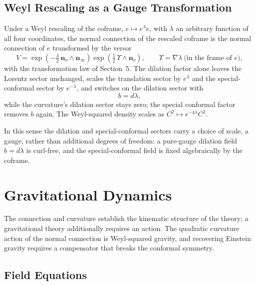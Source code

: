 \documentclass[11pt,a4paper]{article}
\newcommand{\nzero}{\mathbf{n}_o}
\newcommand{\ninf}{\mathbf{n}_\infty}
\newcommand{\wedgeprod}{\mathbin{\wedge}}
\begin{document}
\subsection{Weyl Rescaling as a Gauge Transformation}

Under a Weyl rescaling of the coframe, \(e\mapsto e^\lambda e\), with
\(\lambda\) an arbitrary function of all four coordinates, the normal
connection of the rescaled coframe is the normal connection of \(e\)
transformed by the versor
\[
    \boxed{
        V=\exp\left(-\tfrac{\lambda}{2}\,\nzero\wedgeprod\ninf\right)
          \exp\left(\tfrac12\,\Upsilon\wedgeprod\nzero\right),
        \qquad
        \Upsilon=\nabla\lambda\ \text{(in the frame of }e\text{)},
    }
\]
with the transformation law of Section~5. The dilation factor alone
leaves the Lorentz sector unchanged, scales the translation sector by
\(e^{\lambda}\) and the special-conformal sector by \(e^{-\lambda}\),
and switches on the dilation sector with
\[
    b=d\lambda,
\]
while the curvature's dilation sector stays zero; the special
conformal factor removes \(b\) again. The Weyl-squared density scales
as \(C^2\mapsto e^{-4\lambda}C^2\).

In this sense the dilation and special-conformal sectors carry a
choice of scale, a gauge, rather than additional degrees of freedom:
a pure-gauge dilation field \(b=d\lambda\) is curl-free, and the
special-conformal field is fixed algebraically by the coframe.

\section{Gravitational Dynamics}
\label{sec:dynamics}

The connection and curvature establish the kinematic structure of the
theory; a gravitational theory additionally requires an action. The
quadratic curvature action of the normal connection is Weyl-squared
gravity, and recovering Einstein gravity requires a compensator that
breaks the conformal symmetry.

\subsection{Field Equations}
\end{document}
